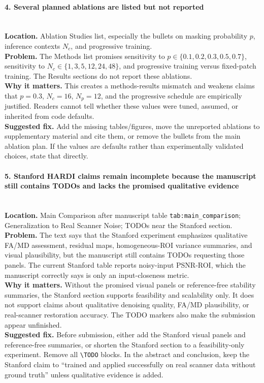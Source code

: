 \documentclass[11pt]{article}
\newcommand{\findingtitle}[1]{\paragraph{#1}\mbox{}\\}
\newcommand{\loc}[1]{\textbf{Location.} #1\\}
\newcommand{\problem}[1]{\textbf{Problem.} #1\\}
\newcommand{\why}[1]{\textbf{Why it matters.} #1\\}
\newcommand{\fix}[1]{\textbf{Suggested fix.} #1\par}
\begin{document}
\findingtitle{4. Several planned ablations are listed but not reported}
\loc{Ablation Studies list, especially the bullets on masking probability $p$, inference contexts $N_c$, and progressive training.}
\problem{The Methods list promises sensitivity to $p\in\{0.1,0.2,0.3,0.5,0.7\}$, sensitivity to $N_c\in\{1,3,5,12,24,48\}$, and progressive training versus fixed-patch training. The Results sections do not report these ablations.}
\why{This creates a methods-results mismatch and weakens claims that $p=0.3$, $N_c=16$, $N_p=12$, and the progressive schedule are empirically justified. Readers cannot tell whether these values were tuned, assumed, or inherited from code defaults.}
\fix{Add the missing tables/figures, move the unreported ablations to supplementary material and cite them, or remove the bullets from the main ablation plan. If the values are defaults rather than experimentally validated choices, state that directly.}

\findingtitle{5. Stanford HARDI claims remain incomplete because the manuscript still contains TODOs and lacks the promised qualitative evidence}
\loc{Main Comparison after manuscript table \texttt{tab:main\_comparison}; Generalization to Real Scanner Noise; TODOs near the Stanford section.}
\problem{The text says that the Stanford experiment emphasizes qualitative FA/MD assessment, residual maps, homogeneous-ROI variance summaries, and visual plausibility, but the manuscript still contains TODOs requesting those panels. The current Stanford table reports noisy-input PSNR-ROI, which the manuscript correctly says is only an input-closeness metric.}
\why{Without the promised visual panels or reference-free stability summaries, the Stanford section supports feasibility and scalability only. It does not support claims about qualitative denoising quality, FA/MD plausibility, or real-scanner restoration accuracy. The TODO markers also make the submission appear unfinished.}
\fix{Before submission, either add the Stanford visual panels and reference-free summaries, or shorten the Stanford section to a feasibility-only experiment. Remove all \texttt{\textbackslash TODO} blocks. In the abstract and conclusion, keep the Stanford claim to ``trained and applied successfully on real scanner data without ground truth'' unless qualitative evidence is added.}
\end{document}
